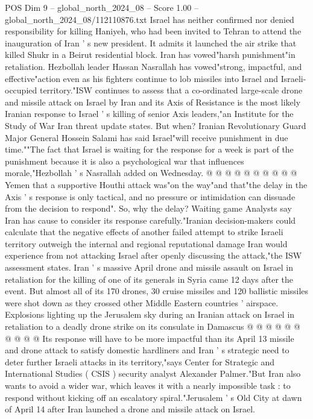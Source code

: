 \begin{textsample}{POS Dim 9 – global\_north\_2024\_08 – Score 1.00 – global\_north\_2024\_08/112110876.txt}  \label{ex:f9_pos_357}
Israel has neither confirmed nor denied responsibility for killing Haniyeh, who had been invited to Tehran to attend the inauguration of Iran ' s new president.
It admits it launched the air strike that killed Shukr in a Beirut residential block.
Iran has vowed"harsh punishment"in retaliation.
Hezbollah leader Hassan Nasrallah has vowed"strong, impactful, and effective"action even as his fighters continue to lob missiles into Israel and Israeli-occupied territory."ISW continues to assess that a co-ordinated large-scale drone and missile attack on Israel by Iran and its Axis of Resistance is the most likely Iranian response to Israel ' s killing of senior Axis leaders,"an Institute for the Study of War Iran threat update states.
But when?
Iranian Revolutionary Guard Major General Hossein Salami has said Israel"will receive punishment in due time.""The fact that Israel is waiting for the response for a week is part of the punishment because it is also a psychological war that influences morale,"Hezbollah ' s Nasrallah added on Wednesday. @ @ @ @ @ @ @ @ @ @ Yemen that a supportive Houthi attack was"on the way"and that"the delay in the Axis ' s response is only tactical, and no pressure or intimidation can dissuade from the decision to respond".
So, why the delay?
Waiting game Analysts say Iran has cause to consider its response carefully."Iranian decision-makers could calculate that the negative effects of another failed attempt to strike Israeli territory outweigh the internal and regional reputational damage Iran would experience from not attacking Israel after openly discussing the attack,"the ISW assessment states.
Iran ' s massive April drone and missile assault on Israel in retaliation for the killing of one of its generals in Syria came 12 days after the event.
But almost all of its 170 drones, 30 cruise missiles and 120 ballistic missiles were shot down as they crossed other Middle Eastern countries ' airspace.
Explosions lighting up the Jerusalem sky during an Iranian attack on Israel in retaliation to a deadly drone strike on its consulate in Damascus @ @ @ @ @ @ @ @ @ @ Its response will have to be more impactful than its April 13 missile and drone attack to satisfy domestic hardliners and Iran ' s strategic need to deter further Israeli attacks in its territory,"says Center for Strategic and International Studies ( CSIS ) security analyst Alexander Palmer."But Iran also wants to avoid a wider war, which leaves it with a nearly impossible task : to respond without kicking off an escalatory spiral."Jerusalem ' s Old City at dawn of April 14 after Iran launched a drone and missile attack on Israel.

\end{textsample}
